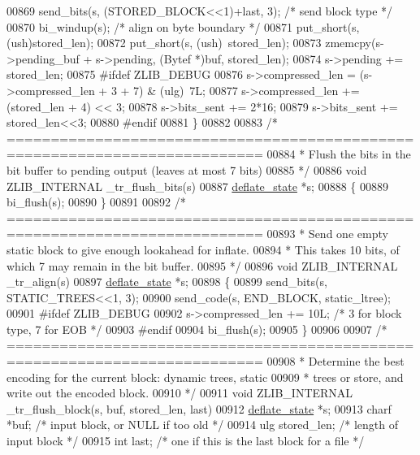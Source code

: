 \begin{DoxyCode}
{{{{{{{{{{{{{{{{{{00869     send\_bits(s, (STORED\_BLOCK<<1)+last, 3);    \textcolor{comment}{/* send block type */}
00870     bi\_windup(s);        \textcolor{comment}{/* align on byte boundary */}
00871     put\_short(s, (ush)stored\_len);
00872     put\_short(s, (ush)~stored\_len);
00873     zmemcpy(s->pending\_buf + s->pending, (Bytef *)buf, stored\_len);
00874     s->pending += stored\_len;
00875 \textcolor{preprocessor}{#ifdef ZLIB\_DEBUG}
00876     s->compressed\_len = (s->compressed\_len + 3 + 7) & (ulg)~7L;
00877     s->compressed\_len += (stored\_len + 4) << 3;
00878     s->bits\_sent += 2*16;
00879     s->bits\_sent += stored\_len<<3;
00880 \textcolor{preprocessor}{#endif}
00881 \}
00882 
00883 \textcolor{comment}{/* ===========================================================================}
00884 \textcolor{comment}{ * Flush the bits in the bit buffer to pending output (leaves at most 7 bits)}
00885 \textcolor{comment}{ */}
00886 \textcolor{keywordtype}{void} ZLIB\_INTERNAL \_tr\_flush\_bits(s)
00887     \hyperlink{structinternal__state}{deflate\_state} *s;
00888 \{
00889     bi\_flush(s);
00890 \}
00891 
00892 \textcolor{comment}{/* ===========================================================================}
00893 \textcolor{comment}{ * Send one empty static block to give enough lookahead for inflate.}
00894 \textcolor{comment}{ * This takes 10 bits, of which 7 may remain in the bit buffer.}
00895 \textcolor{comment}{ */}
00896 \textcolor{keywordtype}{void} ZLIB\_INTERNAL \_tr\_align(s)
00897     \hyperlink{structinternal__state}{deflate\_state} *s;
00898 \{
00899     send\_bits(s, STATIC\_TREES<<1, 3);
00900     send\_code(s, END\_BLOCK, static\_ltree);
00901 \textcolor{preprocessor}{#ifdef ZLIB\_DEBUG}
00902     s->compressed\_len += 10L; \textcolor{comment}{/* 3 for block type, 7 for EOB */}
00903 \textcolor{preprocessor}{#endif}
00904     bi\_flush(s);
00905 \}
00906 
00907 \textcolor{comment}{/* ===========================================================================}
00908 \textcolor{comment}{ * Determine the best encoding for the current block: dynamic trees, static}
00909 \textcolor{comment}{ * trees or store, and write out the encoded block.}
00910 \textcolor{comment}{ */}
00911 \textcolor{keywordtype}{void} ZLIB\_INTERNAL \_tr\_flush\_block(s, buf, stored\_len, last)
00912     \hyperlink{structinternal__state}{deflate\_state} *s;
00913     charf *buf;       \textcolor{comment}{/* input block, or NULL if too old */}
00914     ulg stored\_len;   \textcolor{comment}{/* length of input block */}
00915     \textcolor{keywordtype}{int} last;         \textcolor{comment}{/* one if this is the last block for a file */}
}}}}}}}}}}}}}}}}}}
\end{DoxyCode}
